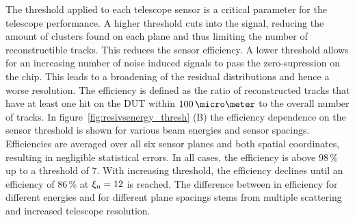 The threshold applied to each telescope sensor is a critical parameter for the telescope performance.
A higher threshold cuts into the signal, reducing the amount of clusters found on each plane and thus limiting the number of reconstructible tracks.
This reduces the sensor efficiency.
A lower threshold allows for an increasing number of noise induced signals to pass the zero-supression on the chip.
This leads to a broadening of the residual distributions and hence a worse resolution. 
The efficiency is defined as the ratio of reconstructed tracks that have at least one hit on the DUT within $100\,\micro\meter$ to the overall number of tracks.
In figure~\ref{fig:resivsenergy_thresh} (B) the efficiency dependence on the sensor threshold is shown for various beam energies and sensor spacings.
Efficiencies are averaged over all six sensor planes and both spatial coordinates, resulting in negligible statistical errors. 
In all cases, the efficiency is above $98\,\%$ up to a threshold of $7$.
With increasing threshold, the efficiency declines until an efficiency of $86\,\%$ at $\xi_{\textrm{n}} = 12$ is reached.
The difference between in efficiency for different energies and for different plane spacings stems from multiple scattering and increased telescope resolution.







